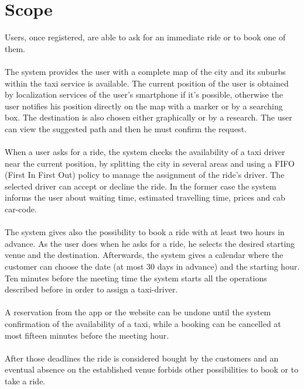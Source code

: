 \section{Scope}
Users, once registered, are able to ask for an immediate ride or to book one of them.\\
\\
The system provides the user with a complete map of the city and its suburbs within the taxi service is available. The current position of the user is obtained by localization services of the user's smartphone if it's possible, otherwise the user notifies his position directly on the map with a marker or by a searching box. The destination is also chosen either graphically or by a research. The user can view the suggested path and then he must confirm the request.\\
\\
When a user asks for a ride, the system checks the availability of a taxi driver near the current position, by splitting the city in several areas and using a FIFO (First In First Out) policy to manage the assignment of the ride's driver. The selected driver can accept or decline the ride. In the former case the system informs the user about waiting time, estimated travelling time, prices and cab car-code. \\
\\
The system gives also the possibility to book a ride with at least two hours in advance. As the user does when he asks for a ride, he selects the desired starting venue and the destination. Afterwards, the system gives a calendar where the customer can choose the date (at most 30 days in advance) and the starting hour. Ten minutes before the meeting time the system starts all the operations described before in order to assign a taxi-driver.\\
\\
A reservation from the app or the website can be undone until the system confirmation of the availability of a taxi, while a booking can be cancelled at most fifteen minutes before the meeting hour.\\
\\
After those deadlines the ride is considered bought by the customers and an eventual absence on the established venue forbids other possibilities to book or to take a ride.


